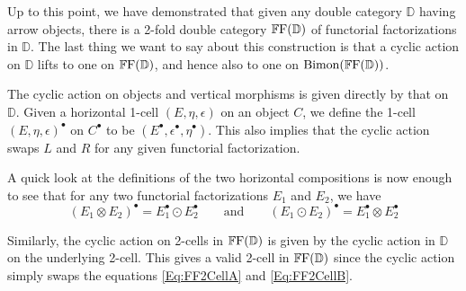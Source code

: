 Up to this point, we have demonstrated that given any double category $\mathbb{D}$ having arrow objects, there is a 2-fold double category $\mathbb{F}\mathrm{F}(\mathbb{D})$ of functorial factorizations in $\mathbb{D}$. The last thing we want to say about this construction is that a cyclic action on $\mathbb{D}$ lifts to one on $\mathbb{F}\mathrm{F}(\mathbb{D})$, and hence also to one on $\mathrm{Bimon}(\mathbb{\mathbb{F}\mathrm{F}(\mathbb{D})})$.

The cyclic action on objects and vertical morphisms is given directly by that on $\mathbb{D}$. Given a horizontal 1-cell $(E,\eta,\epsilon)$ on an object $C$, we define the 1-cell $(E,\eta,\epsilon)^{\bullet}$ on $C^{\bullet}$ to be $(E^{\bullet},\epsilon^{\bullet},\eta^{\bullet})$. This also implies that the cyclic action swaps $L$ and $R$ for any given functorial factorization.

A quick look at the definitions of the two horizontal compositions is now enough to see that for any two functorial factorizations $E_1$ and $E_2$, we have
\[
	(E_1\otimes E_2)^{\bullet} = E_1^{\bullet}\odot E_2^{\bullet}
	\qquad\text{and}\qquad
	(E_1\odot E_2)^{\bullet} = E_1^{\bullet}\otimes E_2^{\bullet}
\]

Similarly, the cyclic action on 2-cells in $\mathbb{F}\mathrm{F}(\mathbb{D})$ is given by the cyclic action in $\mathbb{D}$ on the underlying 2-cell. This gives a valid 2-cell in $\mathbb{F}\mathrm{F}(\mathbb{D})$ since the cyclic action simply swaps the equations \eqref{Eq:FF2CellA} and \eqref{Eq:FF2CellB}. 
